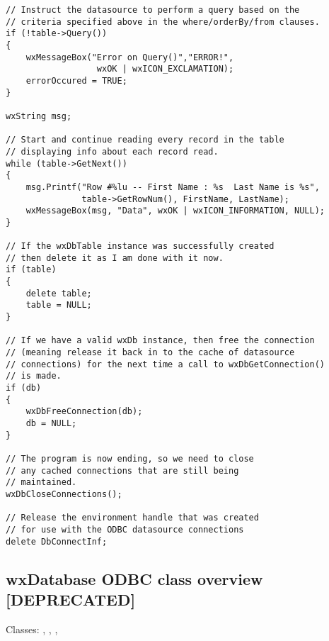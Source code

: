 \begin{verbatim}
// Instruct the datasource to perform a query based on the 
// criteria specified above in the where/orderBy/from clauses.
if (!table->Query())
{
    wxMessageBox("Error on Query()","ERROR!",
                  wxOK | wxICON_EXCLAMATION);
    errorOccured = TRUE;
}

wxString msg;

// Start and continue reading every record in the table
// displaying info about each record read.
while (table->GetNext())
{
    msg.Printf("Row #%lu -- First Name : %s  Last Name is %s",
               table->GetRowNum(), FirstName, LastName);
    wxMessageBox(msg, "Data", wxOK | wxICON_INFORMATION, NULL);
}

// If the wxDbTable instance was successfully created
// then delete it as I am done with it now.
if (table)
{
    delete table;
    table = NULL;
}

// If we have a valid wxDb instance, then free the connection
// (meaning release it back in to the cache of datasource
// connections) for the next time a call to wxDbGetConnection()
// is made.
if (db)
{
    wxDbFreeConnection(db);
    db = NULL;
}

// The program is now ending, so we need to close
// any cached connections that are still being 
// maintained.
wxDbCloseConnections();

// Release the environment handle that was created
// for use with the ODBC datasource connections
delete DbConnectInf;

\end{verbatim}

\subsection{wxDatabase ODBC class overview [DEPRECATED]}\label{oldwxodbcoverview}

Classes: , , ,
\rtfsp{}


